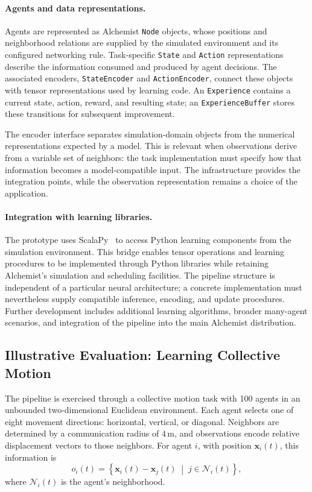 \paragraph{Agents and data representations.}
Agents are represented as Alchemist \texttt{Node} objects, whose positions
 and neighborhood relations are supplied by the simulated environment
 and its configured networking rule.
%
Task-specific \texttt{State} and \texttt{Action} representations describe
 the information consumed and produced by agent decisions.
%
The associated encoders, \texttt{StateEncoder} and \texttt{ActionEncoder},
 connect these objects with tensor representations used by learning code.
%
An \texttt{Experience} contains a current state, action, reward, and
 resulting state; an \texttt{ExperienceBuffer} stores these transitions
 for subsequent improvement.

The encoder interface separates simulation-domain objects from the
 numerical representations expected by a model.
%
This is relevant when observations derive from a variable set of
 neighbors: the task implementation must specify how that information
 becomes a model-compatible input.
%
The infrastructure provides the integration points, while the observation
 representation remains a choice of the application.

\paragraph{Integration with learning libraries.}
The prototype uses ScalaPy~\cite{DBLP:conf/scala/LaddadS20} to access
 Python learning components from the simulation environment.
%
This bridge enables tensor operations and learning procedures to be
 implemented through Python libraries while retaining Alchemist's
 simulation and scheduling facilities.
%
The pipeline structure is independent of a particular neural architecture;
 a concrete implementation must nevertheless supply compatible inference,
 encoding, and update procedures.
%
Further development includes additional learning algorithms, broader
 many-agent scenarios, and integration of the pipeline into the main
 Alchemist distribution.

\subsection{Illustrative Evaluation: Learning Collective Motion}
\label{sec:marlalchemy-evaluation}

The pipeline is exercised through a collective motion task with 100 agents
 in an unbounded two-dimensional Euclidean environment.
%
Each agent selects one of eight movement directions: horizontal, vertical,
 or diagonal.
%
Neighbors are determined by a communication radius of $4\,\mathrm{m}$,
 and observations encode relative displacement vectors to those neighbors.
%
For agent $i$, with position $\mathbf{x}_i(t)$, this information is
\begin{equation}
  o_i(t)=\left\{
    \mathbf{x}_i(t)-\mathbf{x}_j(t)
    \;\middle|\; j\in\mathcal{N}_i(t)
  \right\},
  \label{eq:marlalchemy-observation}
\end{equation}
where $\mathcal{N}_i(t)$ is the agent's neighborhood.

